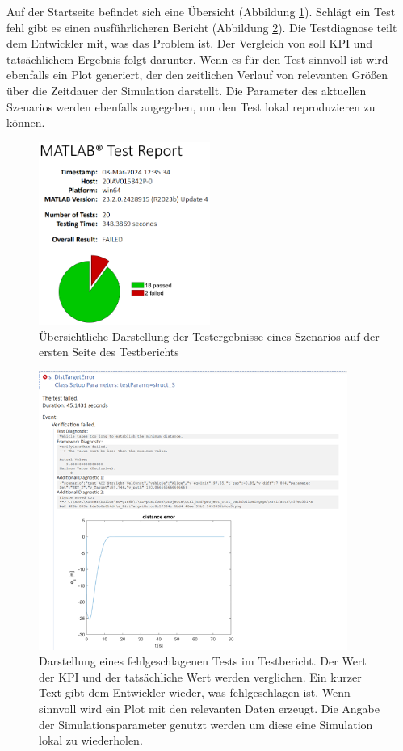 Auf der Startseite befindet sich eine Übersicht (Abbildung \ref{fig:testreport_aufmacher}). Schlägt ein Test fehl gibt es einen ausführlicheren Bericht (Abbildung \ref{fig:failed_test}). Die Testdiagnose teilt dem Entwickler mit, was das Problem ist. Der Vergleich von soll KPI und tatsächlichem Ergebnis folgt darunter. Wenn es für den Test sinnvoll ist wird ebenfalls ein Plot generiert, der den zeitlichen Verlauf von relevanten Größen über die Zeitdauer der Simulation darstellt. Die Parameter des aktuellen Szenarios werden ebenfalls angegeben, um den Test lokal reproduzieren zu können.
\begin{figure}
    \centering
    \includegraphics[width=0.5\textwidth]{figures/3_Implementierung/testreport_aufmacher.png}
    \caption{Übersichtliche Darstellung der Testergebnisse eines Szenarios auf der ersten Seite des Testberichts}
    \label{fig:testreport_aufmacher}
\end{figure}
\begin{figure}
    \centering
    \includegraphics[width=0.9\textwidth]{figures/3_Implementierung/failed_test.png}
    \caption{Darstellung eines fehlgeschlagenen Tests im Testbericht. Der Wert der KPI und der tatsächliche Wert werden verglichen. Ein kurzer Text gibt dem Entwickler wieder, was fehlgeschlagen ist. Wenn sinnvoll wird ein Plot mit den relevanten Daten erzeugt. Die Angabe der Simulationsparameter genutzt werden um diese eine Simulation lokal zu wiederholen.}
    \label{fig:failed_test}
\end{figure}

